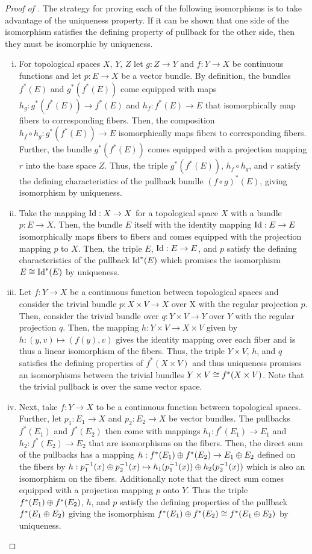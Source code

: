 \documentclass[../../sean_thesis.tex]{subfiles}
\begin{document}
\begin{proof}[Proof of ]
	The strategy for proving each of the following isomorphisms is to take advantage of the uniqueness property. If it can be shown that one side of the isomorphism satisfies the defining property of pullback for the other side, then they must be isomorphic by uniqueness.
	\begin{enumerate}[(i)]
		\item For topological spaces $X$, $Y$, $Z$ let $g: Z \to Y$ and $f: Y \to X$ be continuous functions and let $p: E \to X$ be a vector bundle. By definition, the bundles $f^{*}(E)$ and $g^{*}(f^{*}(E))$ come equipped with maps $h_g: g^{*}(f^{*}(E)) \to f^{*}(E)$ and $h_f: f^{*}(E) \to E$ that isomorphically map fibers to corresponding fibers. Then, the composition $h_f \circ h_g: g^{*}(f^{*}(E)) \to E$ isomorphically maps fibers to corresponding fibers. Further, the bundle $g^{*}(f^{*}(E))$ comes equipped with a projection mapping $r$ into the base space $Z$. Thus, the triple $g^{*}(f^{*}(E))$, $h_f \circ h_g$, and $r$ satisfy the defining characteristics of the pullback bundle $(f \circ g)^{*}(E)$, giving isomorphism by uniqueness.
		\item Take the mapping $\operatorname{Id}: X \to X$ for a topological space $X$ with a bundle $p: E \to X$. Then, the bundle $E$ itself with the identity mapping $\operatorname{Id}: E \to E$ isomorphically maps fibers to fibers and comes equipped with the projection mapping $p$ to $X$. Then, the triple $E$, $\operatorname{Id}: E \to E$, and $p$ satisfy the defining characteristics of the pullback $\operatorname{Id}^{*}(E)$ which promises the isomorphism $E \cong \operatorname{Id}^{*}(E)$ by uniqueness.
		\item Let $f: Y \to X$ be a continuous function between topological spaces and consider the trivial bundle $p: X \times V \to X$ over X with the regular projection $p$. Then, consider the trivial bundle over $q: Y \times V \to Y$ over $Y$ with the regular projection $q$. Then, the mapping $h: Y \times V \to X \times V$ given by $h: (y,v) \mapsto (f(y), v)$ gives the identity mapping over each fiber and is thus a linear isomorphism of the fibers. Thus, the triple $Y \times V$, $h$, and $q$ satisfies the defining properties of $f^{*}(X \times V)$ and thus uniqueness promises an isomorphisms between the trivial bundles $Y \times V \cong f^{*}(X \times V)$. Note that the trivial pullback is over the same vector space.
		\item Next, take $f: Y \to X$ to be a continuous function between topological spaces. Further, let $p_1: E_1 \to X$ and $p_2: E_2 \to X$ be vector bundles. The pullbacks $f^{*}(E_1)$ and $f^{*}(E_2)$ then come with mappings $h_1: f^{*}(E_1) \to E_1$ and $h_2: f^{*}(E_2) \to E_2$ that are isomorphisms on the fibers. Then, the direct sum of the pullbacks has a mapping $h: f^{*}(E_1) \oplus f^{*}(E_2) \to E_1 \oplus E_2$ defined on the fibers by $h: p^{-1}_1(x) \oplus p^{-1}_2(x) \mapsto h_1(p^{-1}_1(x)) \oplus h_2(p^{-1}_2(x))$ which is also an isomorphism on the fibers. Additionally note that the direct sum comes equipped with a projection mapping $p$ onto $Y$. Thus the triple $f^{*}(E_1) \oplus f^{*}(E_2)$, $h$, and $p$ satisfy the defining properties of the pullback $f^{*}(E_1 \oplus E_2)$ giving the isomorphism $f^{*}(E_1) \oplus f^{*}(E_2) \cong f^{*}(E_1 \oplus E_2)$ by uniqueness.

\end{enumerate}
\end{proof}
\end{document}

